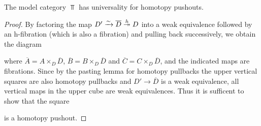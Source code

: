 \begin{prop}\label{lem:topUniversalPo}
    The model category $\Top$ has universality for homotopy pushouts.
    \begin{proof}
        By factoring the map $D'\xrightarrow{\sim}\overline{D}\xtwoheadrightarrow{h} D$ into a weak equivalence followed by an h-fibration (which is also a fibration) and pulling back successively, we obtain the diagram %
        \begin{center}
        \end{center}
        where $\overline{A}=A\times_{D}\overline{D}$, $\overline{B}=B\times_{D}\overline{D}$ and $\overline{C}=C\times_{D}\overline{D}$, and the indicated maps are fibrations.
        Since by the pasting lemma for homotopy pullbacks the upper vertical squares are also homotopy pullbacks and $D'\to\overline{D}$ is a weak equivalence, all vertical maps in the upper cube are weak equivalences.
        Thus it is sufficent to show that the square
        \begin{center}
        \end{center}
        is a homotopy pushout.


\end{proof}
\end{prop}
